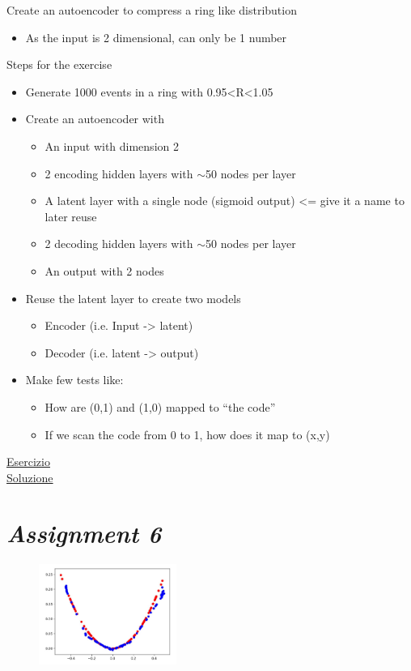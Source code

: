 Create an autoencoder to compress a ring like distribution
\begin{itemize}
	\item As the input is 2 dimensional, can only be 1 number
\end{itemize}
Steps for the exercise
\begin{itemize}
	\item Generate 1000 events in a ring with 0.95<R<1.05
	\item Create an autoencoder with
	\begin{itemize}
		\item An input with dimension 2
		\item 2 encoding hidden layers with $\sim$50 nodes per layer
		\item A latent layer with a single node (sigmoid output) <= give it a name to later reuse
		\item 2 decoding hidden layers with $\sim$50 nodes per layer
		\item An output with 2 nodes
	\end{itemize}
	\item Reuse the latent layer to create two models
	\begin{itemize}
		\item Encoder (i.e. Input -> latent)
		\item Decoder (i.e. latent -> output)
	\end{itemize}
	\item Make few tests like:
	\begin{itemize}
		\item How are (0,1) and (1,0) mapped to “the code”
		\item If we scan the code from 0 to 1, how does it map to (x,y)
	\end{itemize}
\end{itemize}

\href{https://colab.research.google.com/drive/128MRt1zD5iRLhqcUrZz6Bjjndebm7ZSU?usp=sharing}{Esercizio}\\
\href{https://colab.research.google.com/drive/1-mP435EXwv77Z4sEWbMlnVwvtPeWuseD?usp=sharing}{Soluzione}

\section{\textit{Assignment 6}}

\begin{figure}
	\includegraphics[width=0.4\textwidth]{figure_ml/ass6.png}
\end{figure} 

